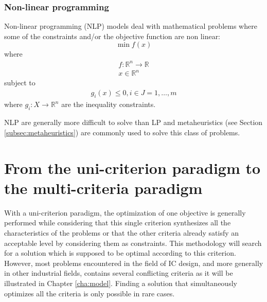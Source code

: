 \subsubsection{Non-linear programming}
Non-linear programming (NLP) models deal with mathematical problems where some of the constraints and/or the objective function are non linear:
\begin{equation}
\min f(x)
\end{equation}
where
\begin{equation*}
\begin{gathered}
f: \mathbb{R}^n \rightarrow \mathbb{R}\\
x \in \mathbb{R}^n
\end{gathered}
\end{equation*}
subject to
\begin{equation*}
\begin{gathered}
g_i(x) \leq 0, i \in J = 1, \dots, m
\end{gathered}
\end{equation*}
where $g_i : X \rightarrow \mathbb{R}^n$ are the inequality constraints.

NLP are generally more difficult to solve than LP \cite{talbi09} and metaheuristics (see Section \ref{subsec:metaheuristics}) are commonly used to solve this class of problems.




\section{From the uni-criterion paradigm to the multi-criteria paradigm}
\label{sec:rol2.unicritmulticrit}

With a uni-criterion paradigm, the optimization of one objective is generally performed while considering that this single criterion synthesizes all the characteristics of the problems or that the other criteria already satisfy an acceptable level by considering them as constraints. This methodology will search for a solution which is supposed to be optimal according to this criterion. However, most problems encountered in the field of IC design, and more generally in other industrial fields, contains several conflicting criteria as it will be illustrated in Chapter \ref{cha:model}. Finding a solution that simultaneously optimizes all the criteria is only possible in rare cases.

